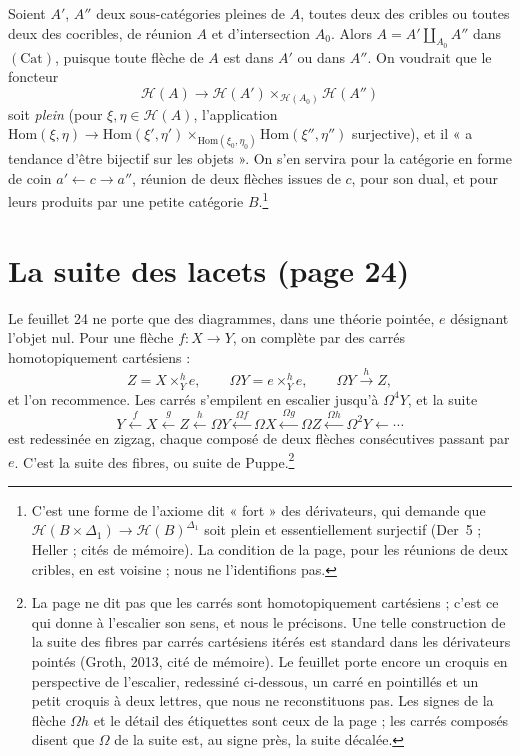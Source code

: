 \documentclass[11pt,a4paper]{article}
\begin{document}
Soient $A'$, $A''$ deux sous-catégories pleines de $A$, toutes deux des
cribles ou toutes deux des cocribles, de réunion $A$ et d'intersection $A_0$.
Alors $A = A' \amalg_{A_0} A''$ dans $(\mathrm{Cat})$, puisque toute flèche de
$A$ est dans $A'$ ou dans $A''$. On voudrait que le foncteur
\[
  \mathcal H(A) \longrightarrow \mathcal H(A') \times_{\mathcal H(A_0)}
  \mathcal H(A'')
\]
soit \emph{plein} (pour $\xi, \eta \in \mathcal H(A)$, l'application
$\mathrm{Hom}(\xi, \eta) \to \mathrm{Hom}(\xi', \eta') \times_{\mathrm{Hom}(\xi_0,
\eta_0)} \mathrm{Hom}(\xi'', \eta'')$ surjective), et il « a tendance d'être
bijectif sur les objets ». On s'en servira pour la catégorie en forme de coin
$a' \leftarrow c \to a''$, réunion de deux flèches issues de $c$, pour son
dual, et pour leurs produits par une petite catégorie $B$.\footnote{C'est une
forme de l'axiome dit « fort » des dérivateurs, qui demande que
$\mathcal H(B \times \Delta_1) \to \mathcal H(B)^{\Delta_1}$ soit plein et
essentiellement surjectif (Der~5 ; Heller ; cités de mémoire). La
condition de la page, pour les réunions de deux cribles, en est voisine ;
nous ne l'identifions pas.}

\section*{La suite des lacets (page 24)}

Le feuillet 24 ne porte que des diagrammes, dans une théorie pointée, $e$
désignant l'objet nul. Pour une flèche $f : X \to Y$, on complète par des
carrés homotopiquement cartésiens :
\[
  Z = X \times^{h}_{Y} e, \qquad \Omega Y = e \times^{h}_{Y} e, \qquad
  \Omega Y \xrightarrow{\ h\ } Z,
\]
et l'on recommence. Les carrés s'empilent en escalier jusqu'à
$\Omega^{4} Y$, et la suite
\[
  Y \xleftarrow{\ f\ } X \xleftarrow{\ g\ } Z \xleftarrow{\ h\ } \Omega Y
  \xleftarrow{\ \Omega f\ } \Omega X \xleftarrow{\ \Omega g\ } \Omega Z
  \xleftarrow{\ \Omega h\ } \Omega^{2} Y \longleftarrow \cdots
\]
est redessinée en zigzag, chaque composé de deux flèches consécutives passant
par $e$. C'est la suite des fibres, ou suite de Puppe.\footnote{La page ne
dit pas que les carrés sont homotopiquement cartésiens ; c'est ce qui donne à
l'escalier son sens, et nous le précisons. Une telle construction de la suite
des fibres par carrés cartésiens itérés est standard dans les dérivateurs
pointés (Groth, 2013, cité de mémoire). Le feuillet porte encore un croquis
en perspective de l'escalier, redessiné ci-dessous, un carré en pointillés et un petit croquis à
deux lettres, que nous ne reconstituons pas. Les signes de la flèche $\Omega
h$ et le détail des étiquettes sont ceux de la page ; les carrés composés
disent que $\Omega$ de la suite est, au signe près, la suite décalée.}
\end{document}
